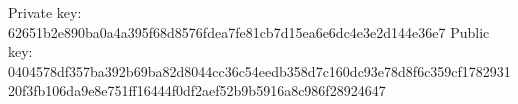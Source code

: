 Private key: 62651b2e890ba0a4a395f68d8576fdea7fe81cb7d15ea6e6dc4e3e2d144e36e7
Public key: 0404578df357ba392b69ba82d8044cc36c54eedb358d7c160dc93e78d8f6c359cf178293120f3fb106da9e8e751ff16444f0df2aef52b9b5916a8c986f28924647
